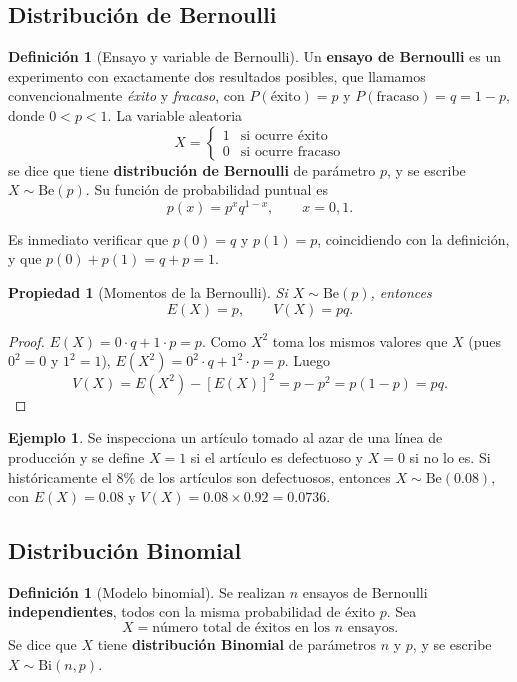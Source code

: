 \documentclass[11pt,a4paper]{article}
\theoremstyle{plain}
\newtheorem{propiedad}[teorema]{Propiedad}
\theoremstyle{definition}
\newtheorem{definicion}[teorema]{Definición}
\newtheorem{ejemplo}[teorema]{Ejemplo}
\theoremstyle{remark}
\begin{document}
\subsection{Distribución de Bernoulli}

\begin{definicion}[Ensayo y variable de Bernoulli]
Un \textbf{ensayo de Bernoulli} es un experimento con exactamente dos resultados posibles, que llamamos convencionalmente \emph{éxito} y \emph{fracaso}, con $P(\text{éxito})=p$ y $P(\text{fracaso})=q=1-p$, donde $0<p<1$. La variable aleatoria
$$X=\begin{cases}1 & \text{si ocurre éxito}\\ 0 & \text{si ocurre fracaso}\end{cases}$$
se dice que tiene \textbf{distribución de Bernoulli} de parámetro $p$, y se escribe $X\sim\text{Be}(p)$. Su función de probabilidad puntual es
$$p(x)=p^xq^{1-x},\qquad x=0,1.$$
\end{definicion}

Es inmediato verificar que $p(0)=q$ y $p(1)=p$, coincidiendo con la definición, y que $p(0)+p(1)=q+p=1$.

\begin{propiedad}[Momentos de la Bernoulli]
Si $X\sim\text{Be}(p)$, entonces
$$E(X)=p, \qquad V(X)=pq.$$
\end{propiedad}
\begin{proof}
$E(X)=0\cdot q+1\cdot p=p$. Como $X^2$ toma los mismos valores que $X$ (pues $0^2=0$ y $1^2=1$), $E(X^2)=0^2\cdot q+1^2\cdot p=p$. Luego
$$V(X)=E(X^2)-[E(X)]^2=p-p^2=p(1-p)=pq.$$
\end{proof}

\begin{ejemplo}
Se inspecciona un artículo tomado al azar de una línea de producción y se define $X=1$ si el artículo es defectuoso y $X=0$ si no lo es. Si históricamente el $8\%$ de los artículos son defectuosos, entonces $X\sim\text{Be}(0.08)$, con $E(X)=0.08$ y $V(X)=0.08\times0.92=0.0736$.
\end{ejemplo}

\subsection{Distribución Binomial}

\begin{definicion}[Modelo binomial]
Se realizan $n$ ensayos de Bernoulli \textbf{independientes}, todos con la misma probabilidad de éxito $p$. Sea
$$X=\text{número total de éxitos en los $n$ ensayos}.$$
Se dice que $X$ tiene \textbf{distribución Binomial} de parámetros $n$ y $p$, y se escribe $X\sim\text{Bi}(n,p)$.
\end{definicion}
\end{document}
